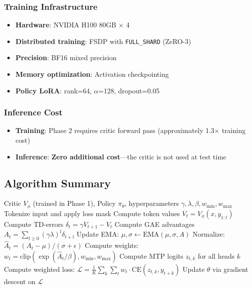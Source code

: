 \subsubsection{Training Infrastructure}

\begin{itemize}[nosep]
    \item \textbf{Hardware}: NVIDIA H100 80GB $\times$ 4
    \item \textbf{Distributed training}: FSDP with \texttt{FULL\_SHARD} (ZeRO-3)
    \item \textbf{Precision}: BF16 mixed precision
    \item \textbf{Memory optimization}: Activation checkpointing
    \item \textbf{Policy LoRA}: rank=64, $\alpha$=128, dropout=0.05
\end{itemize}

\subsubsection{Inference Cost}

\begin{itemize}[nosep]
    \item \textbf{Training}: Phase 2 requires critic forward pass (approximately 1.3$\times$ training cost)
    \item \textbf{Inference}: \textbf{Zero additional cost}---the critic is not used at test time
\end{itemize}

\subsection{Algorithm Summary}

\begin{algorithm}[h]
\caption{Weighted Multi-Token Prediction (WMTP)}
\label{alg:wmtp}
\begin{algorithmic}[1]
\Require Critic $V_\phi$ (trained in Phase 1), Policy $\pi_\theta$, hyperparameters $\gamma, \lambda, \beta, w_{\min}, w_{\max}$
    \State Tokenize input and apply loss mask
    \State Compute token values $V_t = V_\phi(x, y_{1:t})$ 
    \State Compute TD-errors $\delta_t = \gamma V_{t+1} - V_t$
    \State Compute GAE advantages $A_t = \sum_{l \geq 0} (\gamma\lambda)^l \delta_{t+l}$
    \State Update EMA: $\mu, \sigma \leftarrow \text{EMA}(\mu, \sigma, A)$
    \State Normalize: $\hat{A}_t = (A_t - \mu) / (\sigma + \epsilon)$
    \State Compute weights: $w_t = \text{clip}(\exp(\hat{A}_t / \beta), w_{\min}, w_{\max})$
    \State Compute MTP logits $z_{t,k}$ for all heads $k$
    \State Compute weighted loss: $\mathcal{L} = \frac{1}{K} \sum_k \sum_t w_t \cdot \text{CE}(z_{t,k}, y_{t+k})$
    \State Update $\theta$ via gradient descent on $\mathcal{L}$
\EndFor
\end{algorithmic}
\end{algorithm}
